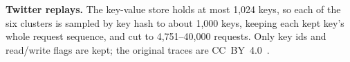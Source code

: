 \documentclass{article}
\newcommand{\wfifteen}{../week_15_update/tables}   %
\newcommand{\finding}[1]{\textbf{#1}\hspace{0.4em}}
\begin{document}
\finding{Twitter replays.} The key-value store holds at most 1,024 keys, so each of the
six clusters is sampled by key hash to about 1,000 keys, keeping each kept key's whole
request sequence, and cut to 4,751--40,000 requests. Only key ids and read/write flags
are kept; the original traces are CC~BY~4.0~\citep{yang2020twitter}.

\begin{table}[h]
\caption{The simulator dataset: 199 streams, 77 of them held out. \texttt{patb} is a
second, independently written pattern suite.}
\label{tab:dataset}
\vskip 0.05in
\begin{center}
\resizebox{\linewidth}{!}{}
\end{center}
\end{table}
\end{document}
